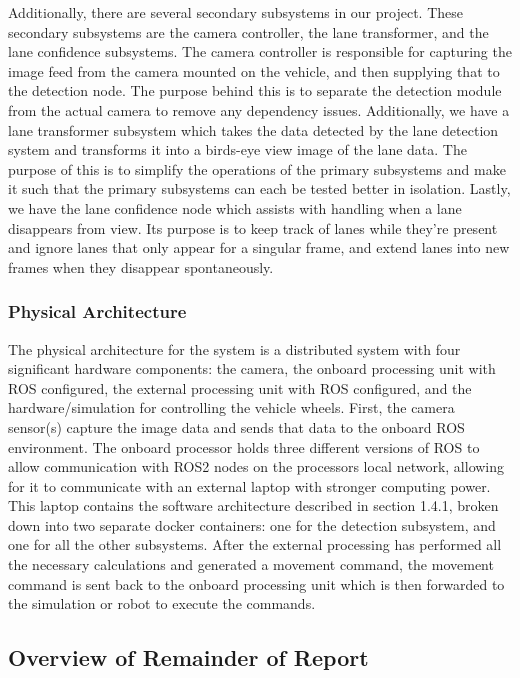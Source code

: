 \documentclass[titlepage,draft]{article}
\begin{document}
Additionally, there are several secondary subsystems in our project. These secondary subsystems are the camera controller, the lane transformer, and the lane confidence subsystems. The camera controller is responsible for capturing the image feed from the camera mounted on the vehicle, and then supplying that to the detection node. The purpose behind this is to separate the detection module from the actual camera to remove any dependency issues. Additionally, we have a lane transformer subsystem which takes the data detected by the lane detection system and transforms it into a birds-eye view image of the lane data. The purpose of this is to simplify the operations of the primary subsystems and make it such that the primary subsystems can each be tested better in isolation. Lastly, we have the lane confidence node which assists with handling when a lane disappears from view. Its purpose is to keep track of lanes while they're present and ignore lanes that only appear for a singular frame, and extend lanes into new frames when they disappear spontaneously.

\subsubsection{Physical Architecture}

The physical architecture for the system is a distributed system with four significant hardware components: the camera, the onboard processing unit with ROS configured, the external processing unit with ROS configured, and the hardware/simulation for controlling the vehicle wheels. First, the camera sensor(s) capture the image data and sends that data to the onboard ROS environment. The onboard processor holds three different versions of ROS to allow communication with ROS2 nodes on the processors local network, allowing for it to communicate with an external laptop with stronger computing power. This laptop contains the software architecture described in section 1.4.1, broken down into two separate docker containers: one for the detection subsystem, and one for all the other subsystems. After the external processing has performed all the necessary calculations and generated a movement command, the movement command is sent back to the onboard processing unit which is then forwarded to the simulation or robot to execute the commands.

\subsection{Overview of Remainder of Report}
\end{document}
